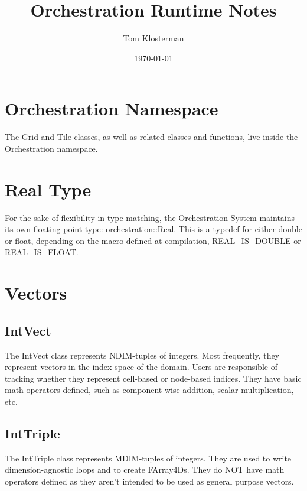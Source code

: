 \documentclass[letterpaper,12pt]{article}
\begin{document}
\title{Orchestration Runtime Notes}
\author{Tom Klosterman}
\date{\today}
\maketitle

\begin{abstract}

\end{abstract}


\section{Orchestration Namespace}

The Grid and Tile classes, as well as related classes and functions, live inside the Orchestration namespace.


\section{Real Type}

For the sake of flexibility in type-matching, the Orchestration System maintains its own floating point type: orchestration::Real. This is a typedef for either double or float, depending on the macro defined at compilation, REAL\_IS\_DOUBLE or REAL\_IS\_FLOAT.

\section{Vectors}
\subsection{IntVect}

The IntVect class represents NDIM-tuples of integers. Most frequently, they represent vectors in the index-space of the domain. Users are responsible of tracking whether they represent cell-based or node-based indices. They have basic math operators defined, such as component-wise addition, scalar multiplication, etc.

\subsection{IntTriple}

The IntTriple class represents MDIM-tuples of integers. They are used to write dimension-agnostic loops and to create FArray4Ds. They do NOT have math operators defined as they aren't intended to be used as general purpose vectors.
\end{document}
